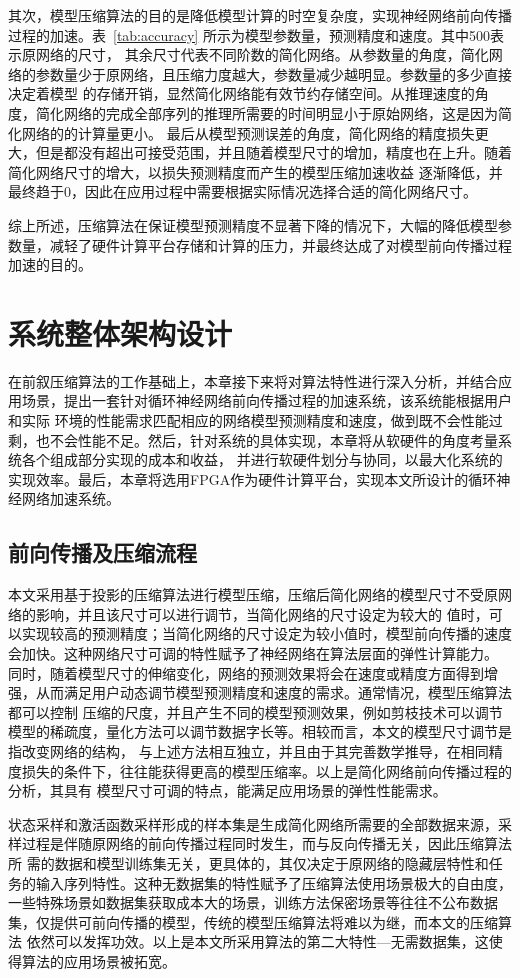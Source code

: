 其次，模型压缩算法的目的是降低模型计算的时空复杂度，实现神经网络前向传播过程的加速。表~\ref{tab:accuracy} 所示为模型参数量，预测精度和速度。其中500表示原网络的尺寸，
其余尺寸代表不同阶数的简化网络。从参数量的角度，简化网络的参数量少于原网络，且压缩力度越大，参数量减少越明显。参数量的多少直接决定着模型
的存储开销，显然简化网络能有效节约存储空间。从推理速度的角度，简化网络的完成全部序列的推理所需要的时间明显小于原始网络，这是因为简化网络的的计算量更小。
最后从模型预测误差的角度，简化网络的精度损失更大，但是都没有超出可接受范围，并且随着模型尺寸的增加，精度也在上升。随着简化网络尺寸的增大，以损失预测精度而产生的模型压缩加速收益
逐渐降低，并最终趋于0，因此在应用过程中需要根据实际情况选择合适的简化网络尺寸。

综上所述，压缩算法在保证模型预测精度不显著下降的情况下，大幅的降低模型参数量，减轻了硬件计算平台存储和计算的压力，并最终达成了对模型前向传播过程加速的目的。

\section{系统整体架构设计}
在前叙压缩算法的工作基础上，本章接下来将对算法特性进行深入分析，并结合应用场景，提出一套针对循环神经网络前向传播过程的加速系统，该系统能根据用户和实际
环境的性能需求匹配相应的网络模型预测精度和速度，做到既不会性能过剩，也不会性能不足。然后，针对系统的具体实现，本章将从软硬件的角度考量系统各个组成部分实现的成本和收益，
并进行软硬件划分与协同，以最大化系统的实现效率。最后，本章将选用FPGA作为硬件计算平台，实现本文所设计的循环神经网络加速系统。
\subsection{前向传播及压缩流程}
本文采用基于投影的压缩算法进行模型压缩，压缩后简化网络的模型尺寸不受原网络的影响，并且该尺寸可以进行调节，当简化网络的尺寸设定为较大的
值时，可以实现较高的预测精度；当简化网络的尺寸设定为较小值时，模型前向传播的速度会加快。这种网络尺寸可调的特性赋予了神经网络在算法层面的弹性计算能力。
同时，随着模型尺寸的伸缩变化，网络的预测效果将会在速度或精度方面得到增强，从而满足用户动态调节模型预测精度和速度的需求。通常情况，模型压缩算法都可以控制
压缩的尺度，并且产生不同的模型预测效果，例如剪枝技术可以调节模型的稀疏度，量化方法可以调节数据字长等。相较而言，本文的模型尺寸调节是指改变网络的结构，
与上述方法相互独立，并且由于其完善数学推导，在相同精度损失的条件下，往往能获得更高的模型压缩率。以上是简化网络前向传播过程的分析，其具有
模型尺寸可调的特点，能满足应用场景的弹性性能需求。

状态采样和激活函数采样形成的样本集是生成简化网络所需要的全部数据来源，采样过程是伴随原网络的前向传播过程同时发生，而与反向传播无关，因此压缩算法所
需的数据和模型训练集无关，更具体的，其仅决定于原网络的隐藏层特性和任务的输入序列特性。这种无数据集的特性赋予了压缩算法使用场景极大的自由度，
一些特殊场景如数据集获取成本大的场景，训练方法保密场景等往往不公布数据集，仅提供可前向传播的模型，传统的模型压缩算法将难以为继，而本文的压缩算法
依然可以发挥功效。以上是本文所采用算法的第二大特性---无需数据集，这使得算法的应用场景被拓宽。

